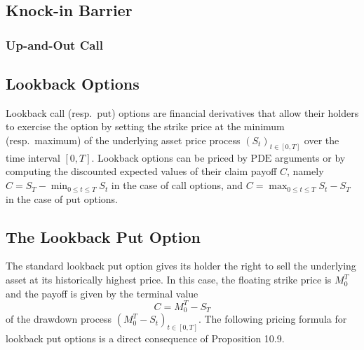 \clearpage
\subsection{Knock-in Barrier}

\subsubsection{Up-and-Out Call}

\subsection{Lookback Options}
Lookback call (resp.\ \(\mathrm{put}\)) options are financial derivatives that allow their holders to exercise the option by setting the strike price at the minimum (resp.\ maximum) of the underlying asset price process \((S_t)_{t \in [0,T]}\) over the time interval \([0,T]\). Lookback options can be priced by \(\mathrm{PDE}\) arguments or by computing the discounted expected values of their claim payoff \(C\), namely \(C = S_T - \min_{0 \le t \le T} S_t\) in the case of call options, and \(C = \max_{0 \le t \le T} S_t - S_T\) in the case of put options.

\subsection{The Lookback Put Option}
The standard lookback put option gives its holder the right to sell the underlying asset at its historically highest price. In this case, the floating strike price is \(M_0^T\) and the payoff is given by the terminal value
\begin{equation}
	C = M_0^T - S_T
\end{equation}
of the drawdown process \((M_0^T - S_t)_{t\in[0,T]}\). The following pricing formula for lookback put options is a direct consequence of Proposition 10.9.

